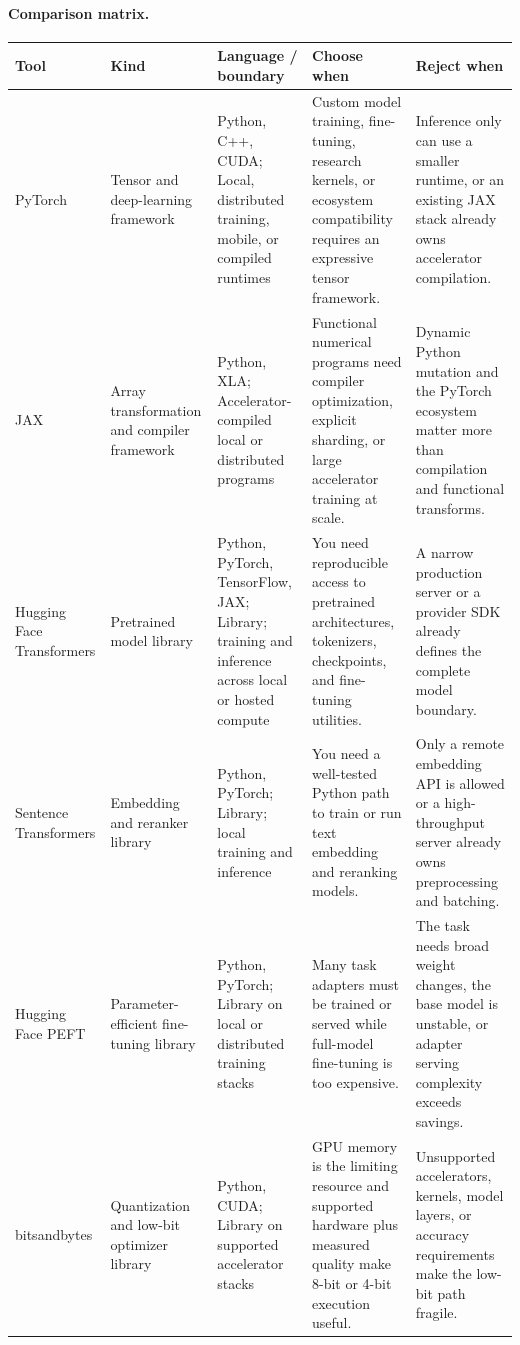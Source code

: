 \paragraph{Comparison matrix.}
\begin{longtable}{@{}p{20mm}p{22mm}p{26mm}p{46mm}p{46mm}@{}}
\toprule\textbf{Tool} & \textbf{Kind} & \textbf{Language / boundary} & \textbf{Choose when} & \textbf{Reject when}\\\midrule\endhead
PyTorch & Tensor and deep-learning framework & Python, C++, CUDA; Local, distributed training, mobile, or compiled runtimes & Custom model training, fine-tuning, research kernels, or ecosystem compatibility requires an expressive tensor framework. & Inference only can use a smaller runtime, or an existing JAX stack already owns accelerator compilation.\\
JAX & Array transformation and compiler framework & Python, XLA; Accelerator-compiled local or distributed programs & Functional numerical programs need compiler optimization, explicit sharding, or large accelerator training at scale. & Dynamic Python mutation and the PyTorch ecosystem matter more than compilation and functional transforms.\\
Hugging Face Transformers & Pretrained model library & Python, PyTorch, TensorFlow, JAX; Library; training and inference across local or hosted compute & You need reproducible access to pretrained architectures, tokenizers, checkpoints, and fine-tuning utilities. & A narrow production server or a provider SDK already defines the complete model boundary.\\
Sentence Transformers & Embedding and reranker library & Python, PyTorch; Library; local training and inference & You need a well-tested Python path to train or run text embedding and reranking models. & Only a remote embedding API is allowed or a high-throughput server already owns preprocessing and batching.\\
Hugging Face PEFT & Parameter-efficient fine-tuning library & Python, PyTorch; Library on local or distributed training stacks & Many task adapters must be trained or served while full-model fine-tuning is too expensive. & The task needs broad weight changes, the base model is unstable, or adapter serving complexity exceeds savings.\\
bitsandbytes & Quantization and low-bit optimizer library & Python, CUDA; Library on supported accelerator stacks & GPU memory is the limiting resource and supported hardware plus measured quality make 8-bit or 4-bit execution useful. & Unsupported accelerators, kernels, model layers, or accuracy requirements make the low-bit path fragile.\\

\end{longtable}
